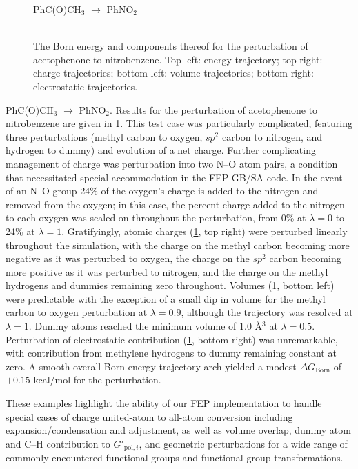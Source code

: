 \documentclass[12pt]{report}
\begin{document}
\begin{figure}[t!]
\centering
PhC(O)CH$_3$  $\longrightarrow$ PhNO$_2$\\
\hspace*{-1.3cm}\\
\hspace*{-1.3cm}
\caption{The Born energy and components thereof for the perturbation of acetophenone to nitrobenzene. Top left: energy trajectory; top right: charge trajectories; bottom left: volume trajectories; bottom right: electrostatic trajectories.}
\label{no2}
\end{figure}

PhC(O)CH$_3$  $\longrightarrow$ PhNO$_2$. Results for the perturbation of acetophenone to nitrobenzene are given in \cref{no2}. This test case was particularly complicated, featuring three perturbations (methyl carbon to oxygen, $sp^2$ carbon to nitrogen, and hydrogen to dummy) and evolution of a net charge. Further complicating management of charge was perturbation into two N--O atom pairs, a condition that necessitated special accommodation in the FEP GB/SA code. In the event of an N--O group 24\% of the oxygen's charge is added to the nitrogen and removed from the oxygen; in this case, the percent charge added to the nitrogen to each oxygen was scaled on throughout the perturbation, from 0\% at $\lambda = 0$ to 24\% at $\lambda = 1$. Gratifyingly, atomic charges (\cref{no2}, top right) were perturbed linearly throughout the simulation, with the charge on the methyl carbon becoming more negative as it was perturbed to oxygen, the charge on the $sp^2$ carbon becoming more positive as it was perturbed to nitrogen, and the charge on the methyl hydrogens and dummies remaining zero throughout. Volumes (\cref{no2}, bottom left) were predictable with the exception of a small dip in volume for the methyl carbon to oxygen perturbation at $\lambda = 0.9$, although the trajectory was resolved at $\lambda = 1$. Dummy atoms reached the minimum volume of 1.0 \AA$^3$ at $\lambda = 0.5$. Perturbation of electrostatic contribution (\cref{no2}, bottom right) was unremarkable, with contribution from methylene hydrogens to dummy remaining constant at zero. A smooth overall Born energy trajectory arch yielded a modest $\Delta G_{ \textrm{Born}}$ of $+0.15$ kcal/mol for the perturbation. 

These examples highlight the ability of our FEP implementation to handle special cases of charge united-atom to all-atom conversion including expansion/condensation and adjustment, as well as volume overlap, dummy atom and C--H contribution to $G'_{ \textrm{pol},i}$, and geometric perturbations for a wide range of commonly encountered functional groups and functional group transformations.
\end{document}
